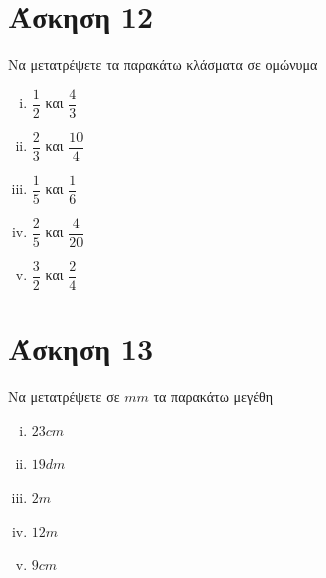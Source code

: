 \documentclass[a4paper,10pt]{report}
\begin{document}
\section*{Άσκηση 12  \hfill \small{}}
Να μετατρέψετε τα παρακάτω κλάσματα σε ομώνυμα
\begin{enumerate}[i)]
 \item $\dfrac{1}{2}$ και $\dfrac{4}{3}$
 \item $\dfrac{2}{3}$ και $\dfrac{10}{4}$
 \item $\dfrac{1}{5}$ και $\dfrac{1}{6}$
 \item $\dfrac{2}{5}$ και $\dfrac{4}{20}$
 \item $\dfrac{3}{2}$ και $\dfrac{2}{4}$
\end{enumerate}


\section*{Άσκηση 13  \hfill \small{}}
Να μετατρέψετε σε $mm$ τα παρακάτω μεγέθη
\begin{enumerate}[i)]
 \item $23cm$
 \item $19dm$
 \item $2m$
 \item $12m$
 \item $9cm$
\end{enumerate}
\end{document}
